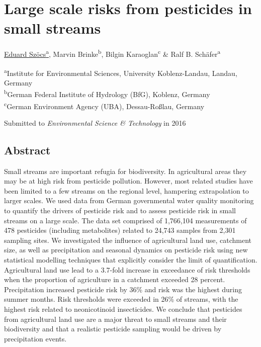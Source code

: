 
\chapter{Large scale risks from pesticides in small streams}
\label{sec:smallstreams}  

\begin{sloppypar}
\bigskip
\underline{Eduard Szöcs\textsuperscript{a}}, Marvin Brinke\textsuperscript{b}, Bilgin Karaoglan\textsuperscript{c} \& Ralf B. Schäfer\textsuperscript{a}

\bigskip
\small
\noindent 
\textsuperscript{a}Institute for Environmental Sciences, University Koblenz-Landau, Landau, Germany \\
\textsuperscript{b}German Federal Institute of Hydrology (BfG), Koblenz, Germany \\
\textsuperscript{c}German Environment Agency (UBA), Dessau-Roßlau, Germany

\bigskip 
\normalsize
\noindent
Submitted to \emph{Environmental Science \& Technology} in 2016

\end{sloppypar}
\cleardoublepage


\section{Abstract}
Small streams are important refugia for biodiversity.
In agricultural areas they may be at high risk from pesticide pollution. 
However, most related studies have been limited to a few streams on the regional level, hampering extrapolation to larger scales. 
We used data from German governmental water quality monitoring to quantify the drivers of pesticide risk and to assess pesticide risk in small streams on a large scale. 
The data set comprised of 1,766,104 measurements of 478 pesticides (including metabolites) related to 24,743 samples from 2,301 sampling sites. 
We investigated the influence of agricultural land use, catchment size, as well as precipitation and seasonal dynamics on pesticide risk using new statistical modelling techniques that explicitly consider the limit of quantification. 
Agricultural land use lead to a 3.7-fold increase in exceedance of risk thresholds when the proportion of agriculture in a catchment exceeded 28 percent. 
Precipitation increased pesticide risk by 36\% and risk was the highest during summer months. 
Risk thresholds were exceeded in 26\% of streams, with the highest risk related to neonicotinoid insecticides. 
We conclude that pesticides from agricultural land use are a major threat to small streams and their biodiversity and that a realistic pesticide sampling would be driven by precipitation events. 

